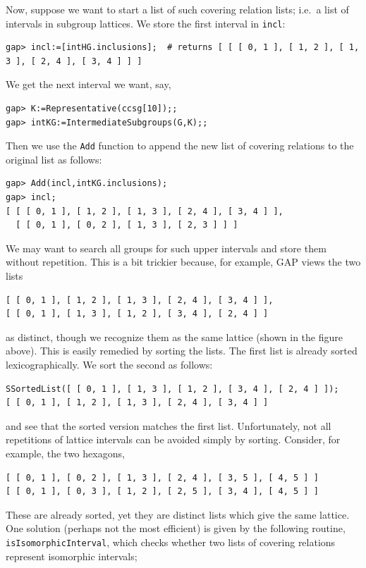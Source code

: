 Now, suppose we want to start a list of such covering relation
lists; i.e.~a list of intervals in subgroup lattices. We store the first
interval in {\tt incl}:
{\codesize
\begin{verbatim}
gap> incl:=[intHG.inclusions];  # returns [ [ [ 0, 1 ], [ 1, 2 ], [ 1, 3 ], [ 2, 4 ], [ 3, 4 ] ] ]
\end{verbatim}}
\noindent We get the next interval we want, say,
{\codesize
\begin{verbatim}
gap> K:=Representative(ccsg[10]);;         
gap> intKG:=IntermediateSubgroups(G,K);;
\end{verbatim}}
\noindent Then we use the {\tt Add} function to append the new list of covering relations
to the original list as follows:
{\codesize
\begin{verbatim}
gap> Add(incl,intKG.inclusions);         
gap> incl;
[ [ [ 0, 1 ], [ 1, 2 ], [ 1, 3 ], [ 2, 4 ], [ 3, 4 ] ], 
  [ [ 0, 1 ], [ 0, 2 ], [ 1, 3 ], [ 2, 3 ] ] ]
\end{verbatim}}
\noindent We may want to search all groups for such upper intervals and store them without
repetition.  This is a bit trickier because, for example, GAP views the two lists
{\codesize
\begin{verbatim}
[ [ 0, 1 ], [ 1, 2 ], [ 1, 3 ], [ 2, 4 ], [ 3, 4 ] ],
[ [ 0, 1 ], [ 1, 3 ], [ 1, 2 ], [ 3, 4 ], [ 2, 4 ] ]
\end{verbatim}}
\noindent as distinct, though we recognize them as the same lattice
(shown in the figure above).  This is easily remedied by sorting the lists.  The
first list is already sorted lexicographically.  We sort the second as follows:
{\codesize
\begin{verbatim}
SSortedList([ [ 0, 1 ], [ 1, 3 ], [ 1, 2 ], [ 3, 4 ], [ 2, 4 ] ]);
[ [ 0, 1 ], [ 1, 2 ], [ 1, 3 ], [ 2, 4 ], [ 3, 4 ] ]
\end{verbatim}}
\noindent and see that the sorted version matches the first list.
Unfortunately, not all repetitions of lattice intervals can be avoided simply by
sorting. Consider, for example, the two hexagons,
{\codesize
\begin{verbatim}
[ [ 0, 1 ], [ 0, 2 ], [ 1, 3 ], [ 2, 4 ], [ 3, 5 ], [ 4, 5 ] ]
[ [ 0, 1 ], [ 0, 3 ], [ 1, 2 ], [ 2, 5 ], [ 3, 4 ], [ 4, 5 ] ]
\end{verbatim}}
\noindent These are already sorted, yet they are distinct lists which
give the same lattice.  One solution (perhaps not the most efficient)
is given by the following routine, {\tt isIsomorphicInterval}, which checks
whether two lists of covering relations represent isomorphic intervals;

